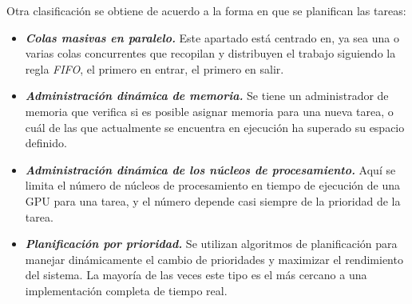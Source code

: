 \begin{itemize}
\begin{itemize}
	\end{itemize}




\end{itemize}
	
Otra clasificación se obtiene de acuerdo a la forma en que se planifican las tareas:

\begin{itemize}

\item \textbf{\textit{Colas masivas en paralelo.}}
	Este apartado está centrado en, ya sea una o varias colas concurrentes que recopilan y distribuyen el trabajo siguiendo la regla \textit{FIFO}, el primero en entrar, el primero en salir. 
	
\item \textbf{\textit{Administración dinámica de memoria.}}
	Se tiene un administrador de memoria que verifica si es posible asignar memoria para una nueva tarea, o cuál de las que actualmente se encuentra en ejecución ha superado su espacio definido. 
	
\item \textbf{\textit{Administración dinámica de los núcleos de procesamiento.}}
	Aquí se limita el número de núcleos de procesamiento en tiempo de ejecución de una GPU para una tarea, y el número depende casi siempre de la prioridad de la tarea.

	
\item \textbf{\textit{Planificación por prioridad.}}
	Se utilizan algoritmos de planificación para manejar dinámicamente el cambio de prioridades y maximizar el rendimiento del sistema. La mayoría de las veces este tipo es el más cercano a una implementación completa de tiempo real.
	
\end{itemize}
     

